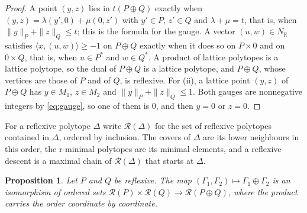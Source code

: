 \documentclass[11pt]{amsart}
\newtheorem{proposition}[theorem]{Proposition}
\theoremstyle{definition}
\theoremstyle{remark}
\newcommand{\R}{\mathbb{R}}
\newcommand{\ip}[2]{\langle #1,#2\rangle}
\begin{document}
\begin{proof}
A point $(y,z)$ lies in $t(P\oplus Q)$ exactly when $(y,z)=\lambda(y',0)+
\mu(0,z')$ with $y'\in P$, $z'\in Q$ and $\lambda+\mu=t$, that is, when
$\|y\|_P+\|z\|_Q\le t$; this is the formula for the gauge. A vector
$(u,w)\in N_\R$ satisfies $\ip{x}{(u,w)}\ge-1$ on $P\oplus Q$ exactly when
it does so on $P\times0$ and on $0\times Q$, that is, when $u\in P^*$ and
$w\in Q^*$. A product of lattice polytopes is a lattice polytope, so the
dual of $P\oplus Q$ is a lattice polytope, and $P\oplus Q$, whose vertices
are those of $P$ and of $Q$, is reflexive. For (ii), a lattice point
$(y,z)$ of $P\oplus Q$ has $y\in M_1$, $z\in M_2$ and
$\|y\|_P+\|z\|_Q\le1$. Both gauges are nonnegative integers by
\eqref{eq:gauge}, so one of them is $0$, and then $y=0$ or $z=0$.
\end{proof}

For a reflexive polytope $\Delta$ write $\mathcal R(\Delta)$ for the set
of reflexive polytopes contained in $\Delta$, ordered by inclusion. The
covers of $\Delta$ are its lower neighbours in this order, the r-minimal
polytopes are its minimal elements, and a reflexive descent is a maximal
chain of $\mathcal R(\Delta)$ that starts at $\Delta$.

\begin{proposition}\label{prop:freesum}
Let $P$ and $Q$ be reflexive. The map
$(\Gamma_1,\Gamma_2)\mapsto\Gamma_1\oplus\Gamma_2$ is an isomorphism of
ordered sets $\mathcal R(P)\times\mathcal R(Q)\to\mathcal R(P\oplus Q)$,
where the product carries the order coordinate by coordinate.
\end{proposition}
\end{document}

